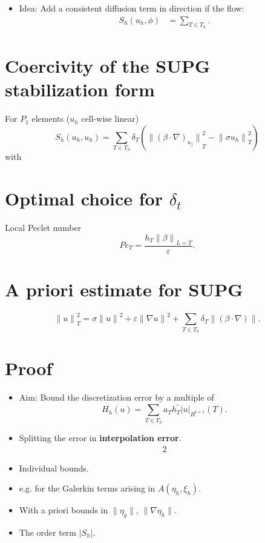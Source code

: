 \documentclass[
	a4paper,
	11pt,
	oneside
]{scrreprt}
\theoremstyle{definition}
\begin{document}
\begin{itemize}
	\item Idea: Add a consistent diffusion term in direction if the flow:
	\begin{align*}
	S_{h}\left(u_{h},\phi\right)&=\sum_{T\in T_{h}}.
	\end{align*}
\end{itemize}

\section{Coercivity of the SUPG stabilization form}

For $P_{1}$ elements ($u_{h}$ cell-wise linear) \[ S_{h}\left(u_{h},u_{h}\right)=\sum_{T\in T_{h}}\delta_{T}\left({\|{\left(\beta\cdot\nabla\right)}_{u_j}\|}^{2}_{T}-{\|\sigma u_{h}\|}^{2}_{T}\right) \] with

\section{Optimal choice for $\delta_{t}$}

Local Peclet number \[ Pe_{T}=\frac{h_{T}{\|\beta\|}_{L=T}}{\varepsilon}. \]

\section{A priori estimate for SUPG}

\[ {\|u\|}^{2}_{T}=\sigma{\|u\|}^{2}+\varepsilon{\|\nabla u\|}^{2}+\sum_{T\in T_{h}}\delta_{T}\|\left(\beta\cdot\nabla\right)\|. \]

\section{Proof}

\begin{itemize}
	\item Aim: Bound the discretization error by a multiple of \[ H_{h}\left(u\right)=\sum_{T\in T_{h}}a_{T}h^{\prime}_{T}{\left|u\right|}_{H^{r+1}}\left(T\right). \]
	\item Splitting the error in \textbf{interpolation error}.
\begin{align*}
2
\end{align*}
\item Individual bounds.
\item e.g. for the Galerkin terms arising in $A\left(\eta_{h},\xi_{h}\right)$.
\item With a priori bounds in $\|\eta_g\|$, $\|\nabla\eta_{h}\|$.
\item The order term $\left|S_{h}\right|$.
\end{itemize}
\end{document}

